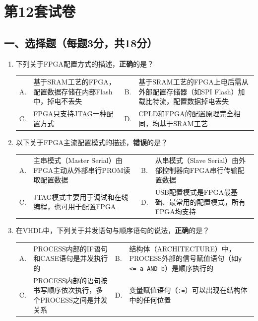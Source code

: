 \chapter{第12套试卷}

\section*{一、选择题（每题3分，共18分）}

\begin{enumerate}[label=\arabic*.]

\item 下列关于FPGA配置方式的描述，\textbf{正确}的是？

\vspace{0.3cm}

\begin{tabular}{@{}lp{}@{\qquad}lp{}@{}}
A. & 基于SRAM工艺的FPGA，配置数据存储在内部Flash中，掉电不丢失 &
B. & 基于SRAM工艺的FPGA上电后需从外部配置存储器（如SPI Flash）加载比特流，配置数据掉电丢失 \\
C. & FPGA只支持JTAG一种配置方式 &
D. & CPLD和FPGA的配置原理完全相同，均基于SRAM工艺 \\
\end{tabular}

\vspace{0.8cm}

\item 以下关于FPGA主流配置模式的描述，\textbf{错误}的是？

\vspace{0.3cm}

\begin{tabular}{@{}lp{}@{\qquad}lp{}@{}}
A. & 主串模式（Master Serial）由FPGA主动从外部串行PROM读取配置数据 &
B. & 从串模式（Slave Serial）由外部控制器向FPGA串行传输配置数据 \\
C. & JTAG模式主要用于调试和在线编程，也可用于配置FPGA &
D. & USB配置模式是FPGA最基础、最常用的配置模式，所有FPGA均支持 \\
\end{tabular}

\vspace{0.8cm}

\item 在VHDL中，下列关于并发语句与顺序语句的说法，\textbf{正确}的是？

\vspace{0.3cm}

\begin{tabular}{@{}lp{}@{\qquad}lp{}@{}}
A. & PROCESS内部的IF语句和CASE语句是并发执行的 &
B. & 结构体（ARCHITECTURE）中，PROCESS外部的信号赋值语句（如\verb|y <= a AND b|）是顺序执行的 \\
C. & PROCESS内部的语句按书写顺序依次执行，多个PROCESS之间是并发关系 &
D. & 变量赋值语句（\texttt{:=}）可以出现在结构体中的任何位置 \\
\end{tabular}


\end{enumerate}
